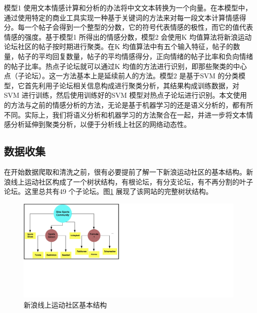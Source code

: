 \documentclass{ctexart}
\begin{document}
        模型1 使用文本情感计算和分析的办法将中文文本转换为一个向量。在本模型中，通过使用特定的商业工具实现一种基于关键词的方法来对每一段文本计算情感得分。每一个帖子会得到一个整型的分数，它的符号代表情感的极性，而它的值代表情感的强度。基于模型1 所得出的情感分数，模型2 会使用K 均值算法将新浪运动论坛社区的帖子按时期进行聚类。在K 均值算法中有五个输入特征，帖子的数量，帖子的平均回复数量，帖子的平均情感得分，正向情绪的帖子比率和负向情绪的帖子比率。热点子论坛就可以通过K 均值的方法进行识别，即那些聚类的中心点（子论坛）。这一方法基本上是延续前人的方法。模型2 是基于SVM 的分类模型，它首先利用子论坛相关信息构成进行聚类分析，其结果构成训练数据，对SVM 进行训练，然后使用训练好的SVM 模型对热点子论坛进行识别。本文使用的方法与之前的情感分析的方法，无论是基于机器学习的还是语义分析的，都有所不同。实际上，我们将语义分析和机器学习的方法聚合在一起，并进一步将文本情感分析延伸到聚类分析，以便于分析线上社区的网络动态性。

        \subsection{数据收集}
            在开始数据爬取和清洗之前，很有必要提前了解一下新浪运动社区的基本结构。新浪线上运动社区构成了一个树状结构，有根论坛，有分支论坛，有不再分割的叶子论坛。这里总共有49 个子论坛。图\ref{fig_2} 展现了该网站的完整树状结构。
            \begin{figure}[hb]
                \centering
                \includegraphics[width=1.1\textwidth]{fig_2}
                \caption{新浪线上运动社区基本结构}
                \label{fig_2}
            \end{figure}
        
\end{document}

